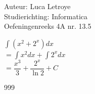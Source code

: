 \documentclass[a4paper]{article}
\begin{document}
  
\noindent \large Auteur: Luca Letroye \\
\noindent \large Studierichting: Informatica\\
\noindent \large Oefeningenreeks 4A nr. 13.5\\

\medskip
\normalsize

$\displaystyle\int (x^2 +2^x)dx$\\

$= \displaystyle\int x^2dx + \displaystyle\int 2^xdx$\\

$= \dfrac{x^3}{3} + \dfrac{2^x}{\ln 2} + C$\\



\begin{thebibliography}{999}
\end{thebibliography}
\end{document}
